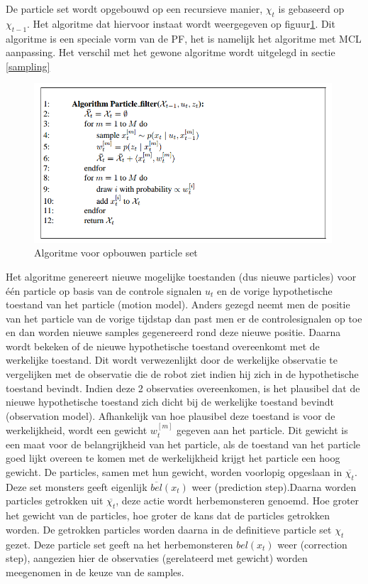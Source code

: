\documentclass{book}
\begin{document}
De particle set wordt opgebouwd op een recursieve manier, $\chi_{t}$ is gebaseerd op $\chi_{t-1}$. Het algoritme dat hiervoor instaat wordt weergegeven op figuur\ref{algoritmePF}. Dit algoritme is een speciale vorm van de PF, het is namelijk het algoritme met MCL aanpassing. Het verschil met het gewone algoritme wordt uitgelegd in sectie \ref{sampling}

\begin{figure}[H]
\centering
\includegraphics[width = 0.99\textwidth]{algoritmePF.png}
\caption{Algoritme voor opbouwen particle set}
\label{algoritmePF}
\end{figure}


Het algoritme genereert nieuwe mogelijke toestanden (dus nieuwe particles) voor één particle op basis van de controle signalen $u_{t}$ en de vorige hypothetische toestand van het particle (motion model). Anders gezegd neemt men de positie van het particle van de vorige tijdstap dan past men er de controlesignalen op toe en dan worden nieuwe samples gegenereerd rond deze nieuwe positie.
Daarna wordt bekeken of de nieuwe hypothetische toestand overeenkomt met de werkelijke toestand. Dit wordt verwezenlijkt door de werkelijke observatie te vergelijken met de observatie die de robot ziet indien hij zich in de hypothetische toestand bevindt. Indien deze 2 observaties overeenkomen, is het plausibel dat de nieuwe hypothetische toestand zich dicht bij de werkelijke toestand bevindt (observation model). Afhankelijk van hoe plausibel deze toestand is voor de werkelijkheid, wordt een gewicht $w_{t}^{[m]}$ gegeven aan het particle. Dit gewicht is een maat voor de belangrijkheid van het particle, als de toestand van het particle goed lijkt overeen te komen met de werkelijkheid krijgt het particle een hoog gewicht.
De particles, samen met hun gewicht, worden voorlopig opgeslaan in $\overline{\chi_{t}}$. Deze set monsters geeft eigenlijk $\overline{bel}(x_t)$ weer (prediction step).Daarna worden particles getrokken uit  $\overline{\chi_{t}}$, deze actie wordt herbemonsteren genoemd. Hoe groter het gewicht van de particles, hoe groter de kans dat de particles getrokken worden. De getrokken particles worden daarna in de definitieve particle set $\chi_{t}$ gezet. Deze particle set geeft na het herbemonsteren $bel(x_{t})$ weer (correction step), aangezien hier de observaties (gerelateerd met gewicht) worden meegenomen in de keuze van de samples.
\end{document}
